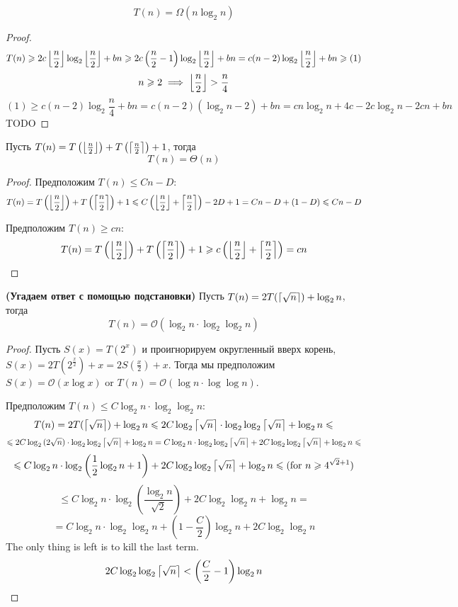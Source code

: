 \begin{example}
    \[ T(n) = \Omega(n \log_2 n) \]
\end{example}
\begin{proof}
    \[ T(n) \geqslant 2c \left\lfloor\frac n 2\right\rfloor \log_2 \left\lfloor\frac n 2\right\rfloor + bn \geqslant 2c \left(\frac n 2 - 1 \right) \log_2 \left\lfloor\frac n 2\right\rfloor + bn = c (n - 2) \log_2 \left\lfloor\frac n 2\right\rfloor + bn \geqslant (1) \]
    \[ n \geqslant 2 \implies \left\lfloor\frac n 2\right\rfloor > \frac n 4 \]
    \[ (1) \ge c (n - 2) \log_2 \frac n 4 + bn = c (n - 2) (\log_2 n - 2) + bn = c n \log_2 n + 4c - 2c \log_2 n - 2cn + bn \]
    TODO
\end{proof}

\begin{example}
    Пусть $T(n) = T\left(\left\lfloor\frac n 2\right\rfloor\right) + T\left(\left\lceil\frac n 2\right\rceil\right) + 1$, тогда
    \[ T(n) = \Theta(n) \]
\end{example}
\begin{proof}
    Предположим $T(n) \le Cn - D$: \\
    \[ T(n) = T\left(\left\lfloor\frac n 2\right\rfloor\right) + T\left(\left\lceil\frac n 2\right\rceil\right) + 1 \leqslant C \left(\left\lfloor\frac n 2\right\rfloor + \left\lceil\frac n 2\right\rceil \right) - 2D + 1 = Cn - D + (1 - D) \leqslant Cn - D \]

    Предположим $T(n) \ge cn$: \\
    \[ T(n) = T\left(\left\lfloor\frac n 2\right\rfloor\right) + T\left(\left\lceil\frac n 2\right\rceil\right) + 1 \geqslant c \left(\left\lfloor\frac n 2\right\rfloor + \left\lceil\frac n 2\right\rceil \right) = cn \]
\end{proof}

\begin{example}\textbf{(Угадаем ответ с помощью подстановки)} Пусть $ T(n) = 2 T(\left\lceil\sqrt n\right\rceil) + \log_2 n $, тогда
    \[ T(n) = \mathcal{O}(\log_2 n \cdot \log_2 \log_2 n) \]
\end{example}
\begin{proof}
    Пусть $S(x) = T(2 ^ x)$ и проигнорируем округленный вверх корень, $S(x) = 2 T(2 ^ {\frac x 2}) + x = 2S(\frac x 2) + x $.
    Тогда мы предположим $S(x) = \mathcal{O}(x \log x)$ or $T(n) = \mathcal{O}(\log n \cdot \log \log n)$.

    Предположим $ T(n) \le C \log_2 n \cdot \log_2 \log_2 n $:
    \[
        T(n) =
        2 T(\left\lceil\sqrt n\right\rceil) + \log_2 n \leqslant
        2C \log_2{\left\lceil\sqrt n\right\rceil} \cdot \log_2 \log_2 {\left\lceil\sqrt n\right\rceil} + \log_2 n \leqslant
    \]\[
        \leqslant 2C \log_2{(2 \sqrt n)} \cdot \log_2 \log_2 {\left\lceil\sqrt n\right\rceil} + \log_2 n =
        C \log_2{n} \cdot \log_2 \log_2 {\left\lceil\sqrt n\right\rceil} + 2C\log_2 \log_2 {\left\lceil\sqrt n\right\rceil} + \log_2 n \leqslant
    \]\[
        \leqslant C \log_2{n} \cdot \log_2 \left(\frac 1 2 \log_2 {n} + 1\right) + 2C\log_2 \log_2 {\left\lceil\sqrt n\right\rceil} + \log_2 n \leqslant (\text{for } n \geqslant 4^{\sqrt{2} + 1})
    \]\[
        \le C \log_2{n} \cdot \log_2 \left(\frac{\log_2 {n}}{\sqrt{2}} \right) + 2C\log_2 \log_2 n + \log_2 n =
    \]\[
        = C \log_2{n} \cdot \log_2 \log_2 {n} + \left( 1 - \frac C 2 \right) \log_2{n} + 2C\log_2 \log_2 n
    \]
    The only thing is left is to kill the last term.
    \[ 2C\log_2 \log_2 {\left\lceil\sqrt n\right\rceil} < \left(\frac C 2 - 1 \right) \log_2{n} \]
\end{proof}

